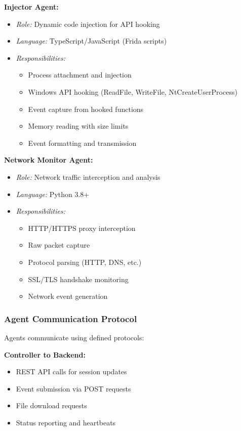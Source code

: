\textbf{Injector Agent:}
\begin{itemize}
    \item \textit{Role:} Dynamic code injection for API hooking
    \item \textit{Language:} TypeScript/JavaScript (Frida scripts)
    \item \textit{Responsibilities:}
    \begin{itemize}
        \item Process attachment and injection
        \item Windows API hooking (ReadFile, WriteFile, NtCreateUserProcess)
        \item Event capture from hooked functions
        \item Memory reading with size limits
        \item Event formatting and transmission
    \end{itemize}
\end{itemize}

\textbf{Network Monitor Agent:}
\begin{itemize}
    \item \textit{Role:} Network traffic interception and analysis
    \item \textit{Language:} Python 3.8+
    \item \textit{Responsibilities:}
    \begin{itemize}
        \item HTTP/HTTPS proxy interception
        \item Raw packet capture
        \item Protocol parsing (HTTP, DNS, etc.)
        \item SSL/TLS handshake monitoring
        \item Network event generation
    \end{itemize}
\end{itemize}

\subsubsection{Agent Communication Protocol}

Agents communicate using defined protocols:

\textbf{Controller to Backend:}
\begin{itemize}
    \item REST API calls for session updates
    \item Event submission via POST requests
    \item File download requests
    \item Status reporting and heartbeats
\end{itemize}

